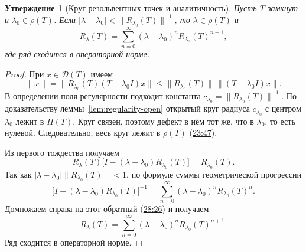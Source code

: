 \documentclass[11pt,a4paper]{article}
\theoremstyle{plain}
\newtheorem{proposition}[theorem]{Утверждение}
\theoremstyle{definition}
\newcommand{\Dom}{\mathcal D}
\newcommand{\id}{I}
\newcommand{\norm}[1]{\lVert#1\rVert}
\newcommand{\at}[3]{\href{https://www.youtube.com/watch?v=#1&t=#2s}{#3}}
\begin{document}
\begin{proposition}[Круг резольвентных точек и аналитичность]
Пусть $T$ замкнут и $\lambda_0\in\rho(T)$. Если
$|\lambda-\lambda_0|<\norm{R_{\lambda_0}(T)}^{-1}$,
то $\lambda\in\rho(T)$ и
\[
 R_\lambda(T)=\sum_{n=0}^\infty
   (\lambda-\lambda_0)^n R_{\lambda_0}(T)^{n+1},
\]
где ряд сходится в операторной норме.
\end{proposition}
\begin{proof}
При $x\in\Dom(T)$ имеем
\[
 \norm{x}=\norm{R_{\lambda_0}(T)(T-\lambda_0\id)x}
 \le\norm{R_{\lambda_0}(T)}\,\norm{(T-\lambda_0\id)x}.
\]
В определении поля регулярности подходит константа
$c_{\lambda_0}=\norm{R_{\lambda_0}(T)}^{-1}$.
По доказательству леммы~\ref{lem:regularity-open} открытый
круг радиуса $c_{\lambda_0}$ с центром $\lambda_0$ лежит
в $\Pi(T)$. Круг связен, поэтому дефект в нём тот же,
что в $\lambda_0$, то есть нулевой. Следовательно,
весь круг лежит в $\rho(T)$ (\at{pe5XWL9wtg4}{1427}{23:47}).

Из первого тождества получаем
\[
 R_\lambda(T)\bigl[\id-(\lambda-\lambda_0)R_{\lambda_0}(T)\bigr]
 =R_{\lambda_0}(T).
\]
Так как $|\lambda-\lambda_0|\norm{R_{\lambda_0}(T)}<1$,
по формуле суммы геометрической прогрессии
\[
 \bigl[\id-(\lambda-\lambda_0)R_{\lambda_0}(T)\bigr]^{-1}
 =\sum_{n=0}^\infty(\lambda-\lambda_0)^n R_{\lambda_0}(T)^n.
\]
Домножаем справа на этот обратный
(\at{pe5XWL9wtg4}{1706}{28:26}) и получаем
\[
 R_\lambda(T)=\sum_{n=0}^\infty(\lambda-\lambda_0)^n
        R_{\lambda_0}(T)^{n+1}.
\]
Ряд сходится в операторной норме.
\end{proof}
\end{document}
